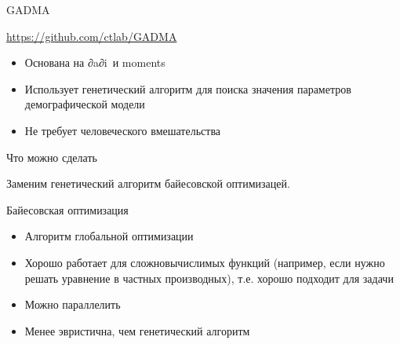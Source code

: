 \documentclass[
  russian,
  ignorenonframetext,
]{beamer}
\providecommand{\tightlist}{%
  \setlength{\itemsep}{0pt}\setlength{\parskip}{0pt}}
\begin{document}
\begin{frame}{GADMA}
\protect\hypertarget{gadma}{}

\url{https://github.com/ctlab/GADMA}

\begin{itemize}
\tightlist
\item
  Основана на ∂a∂i\ и moments
\item
  Использует генетический алгоритм для поиска значения параметров
  демографической модели
\item
  Не требует человеческого вмешательства
\end{itemize}

\end{frame}

\begin{frame}[standout]{Что можно сделать}
\protect\hypertarget{ux447ux442ux43e-ux43cux43eux436ux43dux43e-ux441ux434ux435ux43bux430ux442ux44c}{}

Заменим генетический алгоритм байесовской оптимизацей.

\end{frame}

\begin{frame}{Байесовская оптимизация}
\protect\hypertarget{ux431ux430ux439ux435ux441ux43eux432ux441ux43aux430ux44f-ux43eux43fux442ux438ux43cux438ux437ux430ux446ux438ux44f}{}

\begin{itemize}
\tightlist
\item
  Алгоритм глобальной оптимизации
\item
  Хорошо работает для сложновычислимых функций (например, если нужно
  решать уравнение в частных производных), т.е. хорошо подходит для
  задачи
\item
  Можно параллелить
\item
  Менее эвристична, чем генетический алгоритм
\end{itemize}

\end{frame}
\end{document}
